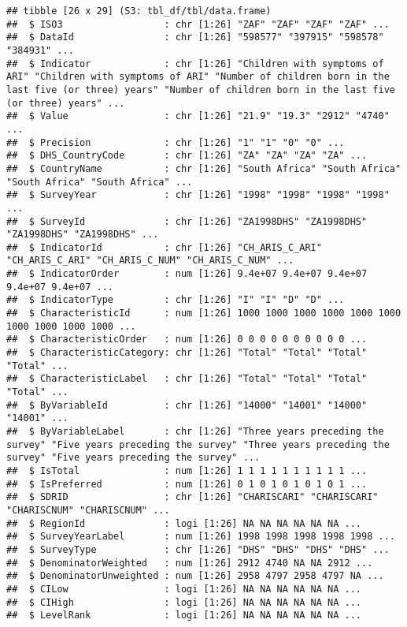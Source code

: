 \documentclass[
]{article}
\begin{document}
\begin{verbatim}
## tibble [26 x 29] (S3: tbl_df/tbl/data.frame)
##  $ ISO3                  : chr [1:26] "ZAF" "ZAF" "ZAF" "ZAF" ...
##  $ DataId                : chr [1:26] "598577" "397915" "598578" "384931" ...
##  $ Indicator             : chr [1:26] "Children with symptoms of ARI" "Children with symptoms of ARI" "Number of children born in the last five (or three) years" "Number of children born in the last five (or three) years" ...
##  $ Value                 : chr [1:26] "21.9" "19.3" "2912" "4740" ...
##  $ Precision             : chr [1:26] "1" "1" "0" "0" ...
##  $ DHS_CountryCode       : chr [1:26] "ZA" "ZA" "ZA" "ZA" ...
##  $ CountryName           : chr [1:26] "South Africa" "South Africa" "South Africa" "South Africa" ...
##  $ SurveyYear            : chr [1:26] "1998" "1998" "1998" "1998" ...
##  $ SurveyId              : chr [1:26] "ZA1998DHS" "ZA1998DHS" "ZA1998DHS" "ZA1998DHS" ...
##  $ IndicatorId           : chr [1:26] "CH_ARIS_C_ARI" "CH_ARIS_C_ARI" "CH_ARIS_C_NUM" "CH_ARIS_C_NUM" ...
##  $ IndicatorOrder        : num [1:26] 9.4e+07 9.4e+07 9.4e+07 9.4e+07 9.4e+07 ...
##  $ IndicatorType         : chr [1:26] "I" "I" "D" "D" ...
##  $ CharacteristicId      : num [1:26] 1000 1000 1000 1000 1000 1000 1000 1000 1000 1000 ...
##  $ CharacteristicOrder   : num [1:26] 0 0 0 0 0 0 0 0 0 0 ...
##  $ CharacteristicCategory: chr [1:26] "Total" "Total" "Total" "Total" ...
##  $ CharacteristicLabel   : chr [1:26] "Total" "Total" "Total" "Total" ...
##  $ ByVariableId          : chr [1:26] "14000" "14001" "14000" "14001" ...
##  $ ByVariableLabel       : chr [1:26] "Three years preceding the survey" "Five years preceding the survey" "Three years preceding the survey" "Five years preceding the survey" ...
##  $ IsTotal               : num [1:26] 1 1 1 1 1 1 1 1 1 1 ...
##  $ IsPreferred           : num [1:26] 0 1 0 1 0 1 0 1 0 1 ...
##  $ SDRID                 : chr [1:26] "CHARISCARI" "CHARISCARI" "CHARISCNUM" "CHARISCNUM" ...
##  $ RegionId              : logi [1:26] NA NA NA NA NA NA ...
##  $ SurveyYearLabel       : num [1:26] 1998 1998 1998 1998 1998 ...
##  $ SurveyType            : chr [1:26] "DHS" "DHS" "DHS" "DHS" ...
##  $ DenominatorWeighted   : num [1:26] 2912 4740 NA NA 2912 ...
##  $ DenominatorUnweighted : num [1:26] 2958 4797 2958 4797 NA ...
##  $ CILow                 : logi [1:26] NA NA NA NA NA NA ...
##  $ CIHigh                : logi [1:26] NA NA NA NA NA NA ...
##  $ LevelRank             : logi [1:26] NA NA NA NA NA NA ...
\end{verbatim}
\end{document}
